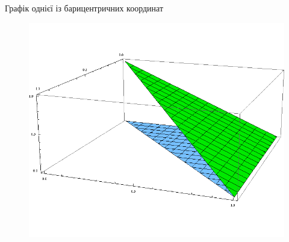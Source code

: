 \begin{frame}{Графік однієї із барицентричних координат}
	\begin{figure}[H]
		\centering
	    \includegraphics[height=\textheight]{images/barycentric}
	    \label{fig:barycentric_coordinates}
	\end{figure}
\end{frame}

